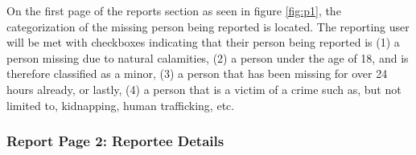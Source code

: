 On the first page of the reports section as seen in figure \ref{fig:p1}, the categorization of the missing person being reported is located. The reporting user will be met with checkboxes indicating that their person being reported is (1) a person missing due to natural calamities, (2) a person under the age of 18, and is therefore classified as a minor, (3) a person that has been missing for over 24 hours already, or lastly, (4) a person that is a victim of a crime such as, but not limited to, kidnapping, human trafficking, etc.

\subsubsection{Report Page 2: Reportee Details}

\begin{figure}[!h]
    \centering
    \begin{subfigure}[c]{0.30\linewidth}
        \centering

\end{subfigure}
\end{figure}
